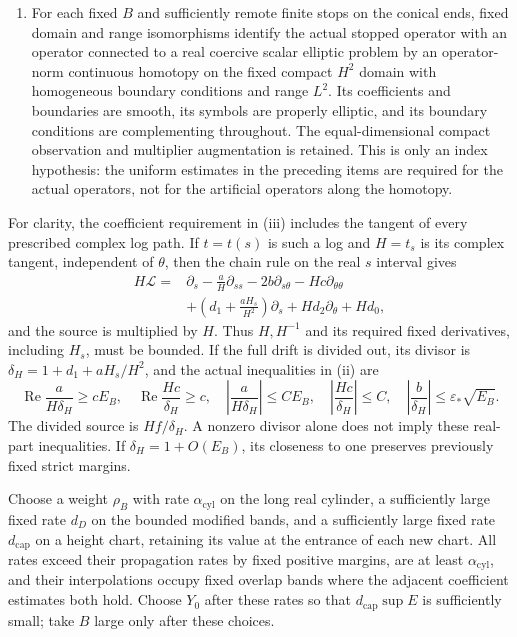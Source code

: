 \begin{proposition}
\begin{enumerate}
 domain-to-range perturbation hypotheses in (ii).  These requirements
 exclude distributional seams.  The coefficients on conical ends satisfy
 Lemma~\ref{lin:conical}, up to a small domain-to-range perturbation.
 \item For each fixed $B$ and sufficiently remote finite stops on
 the conical ends, fixed domain and range isomorphisms identify the
 actual stopped operator with an operator connected to a real
 coercive scalar elliptic problem by an operator-norm continuous homotopy
 on the fixed compact $H^2$ domain with homogeneous boundary
 conditions and range $L^2$. Its coefficients and boundaries are smooth,
 its symbols are properly elliptic, and its boundary conditions are
 complementing throughout. The equal-dimensional
 compact observation and multiplier augmentation is retained.
 This is only an index hypothesis: the uniform estimates in the
 preceding items are required for the actual operators, not for
 the artificial operators along the homotopy.
\end{enumerate}

For clarity, the coefficient requirement in (iii) includes the tangent
of every prescribed complex log path.  If $t=t(s)$ is such a log and
$H=t_s$ is its complex tangent, independent of $\theta$, then the chain
rule on the real $s$ interval gives
\begin{equation}\label{lin:complex-log-pullback}
 \begin{split}
 H\mathcal L={}&\partial_s-\frac aH\partial_{ss}
       -2b\partial_{s\theta}-Hc\partial_{\theta\theta}\\
 &+\left(d_1+\frac{aH_s}{H^2}\right)\partial_s
       +Hd_2\partial_\theta+Hd_0,
 \end{split}
\end{equation}
and the source is multiplied by $H$.  Thus $H,H^{-1}$ and its required
fixed derivatives, including $H_s$, must be bounded.  If the full drift
is divided out, its divisor is
$\delta_H=1+d_1+aH_s/H^2$, and the actual inequalities in (ii) are
\[
 \operatorname{Re}\frac{a}{H\delta_H}\ge cE_B,\quad
 \operatorname{Re}\frac{Hc}{\delta_H}\ge c,\quad
 \left|\frac{a}{H\delta_H}\right|\le CE_B,\quad
 \left|\frac{Hc}{\delta_H}\right|\le C,\quad
 \left|\frac b{\delta_H}\right|\le\varepsilon_*\sqrt{E_B}.
\]
The divided source is $Hf/\delta_H$.  A nonzero divisor alone does not
imply these real-part inequalities.  If $\delta_H=1+O(E_B)$, its
closeness to one preserves previously fixed strict margins.

Choose a weight $\rho_B$ with rate $\alpha_{\mathrm{cyl}}$ on the long real cylinder,
a sufficiently large fixed rate $d_D$ on the bounded modified bands,
and a sufficiently large fixed rate $d_{\mathrm{cap}}$ on a height
chart, retaining its value at the entrance of each new chart.  All
rates exceed their propagation rates by fixed positive margins, are at
least $\alpha_{\mathrm{cyl}}$, and
their interpolations occupy fixed overlap bands where the adjacent
coefficient estimates both hold.  Choose $Y_0$ after these
rates so that $d_{\mathrm{cap}}\sup E$ is sufficiently small; take $B$
large only after these choices.


\end{proposition}
